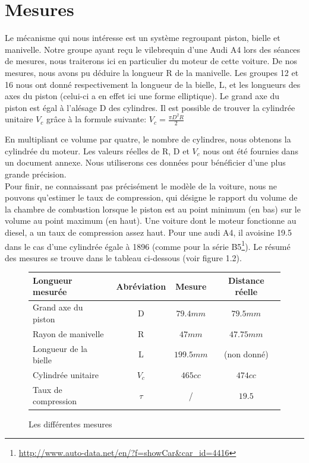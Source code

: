 \documentclass[a4paper,oneside,12pt]{report}
\begin{document}

\section{Mesures}

Le mécanisme qui nous intéresse est un système regroupant piston, bielle et manivelle. Notre groupe ayant reçu le vilebrequin d'une Audi A4 lors des séances de mesures, nous traiterons ici en particulier du moteur de cette voiture. De nos mesures, nous avons pu déduire la longueur R de la manivelle. Les groupes 12 et 16 nous ont donné respectivement la longueur de la bielle, L, et les longueurs des axes du piston (celui-ci a en effet ici une forme elliptique). Le grand axe du piston est égal à l'alésage D des cylindres. Il est possible de trouver la cylindrée unitaire $V_c$ grâce à la formule suivante: 
$V_c =\frac{\pi D^2 R}{2}$

En multipliant ce volume par quatre, le nombre de cylindres, nous obtenons la cylindrée du moteur. Les valeurs réelles de R, D et $V_c$ nous ont été fournies dans un document annexe. Nous utiliserons ces données pour bénéficier d'une plus grande précision.\\

Pour finir, ne connaissant pas précisément le modèle de la voiture, nous ne pouvons qu'estimer le taux de compression, qui désigne le rapport du volume de la chambre de combustion lorsque le piston est au point minimum (en bas) sur le volume au point maximum (en haut). Une voiture dont le moteur fonctionne au diesel, a un taux de compression assez haut. Pour une audi A4, il avoisine 19.5 dans le cas d'une cylindrée égale à 1896 (comme pour la série
B5\footnote{\url{http://www.auto-data.net/en/?f=showCar&car_id=4416}}). Le résumé des mesures se trouve dans le tableau ci-dessous (voir figure 1.2).

\begin{figure}[h]
\centering
\begin{tabular}{|l|c|c|c|}
  \hline
  Longueur mesurée & Abréviation & Mesure & Distance réelle\\
  \hline
  Grand axe du piston & D & $79.4mm$ & $79.5mm$ \\
  Rayon de manivelle & R & $47mm$ & $47.75mm$\\
  Longueur de la bielle & L & $199.5mm$ & (non donné)\\
  Cylindrée unitaire & $V_c$  & $465cc$ & $474cc$\\
  Taux de compression & $\tau$ & / & $19.5$\\
  \hline
\end{tabular}
\caption{Les différentes mesures}
\end{figure}
\end{document}

